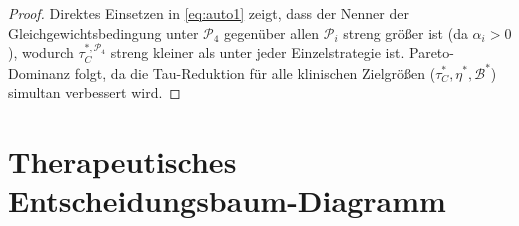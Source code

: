 ﻿\documentclass[12pt,a4paper]{article}
\theoremstyle{definition}
\begin{document}
	\begin{proof}
		Direktes Einsetzen in \eqref{eq:auto1} zeigt, dass der Nenner der Gleichgewichtsbedingung unter $\mathcal{P}_4$ gegenüber allen $\mathcal{P}_i$ streng größer ist (da $\alpha_i > 0$), wodurch $\tau_C^{*,\mathcal{P}_4}$ streng kleiner als unter jeder Einzelstrategie ist. Pareto-Dominanz folgt, da die Tau-Reduktion für alle klinischen Zielgrößen ($\tau_C^*, \eta^*, \mathcal{B}^*$) simultan verbessert wird.
	\end{proof}
	
	\section{Therapeutisches Entscheidungsbaum-Diagramm}
	
\end{document}
